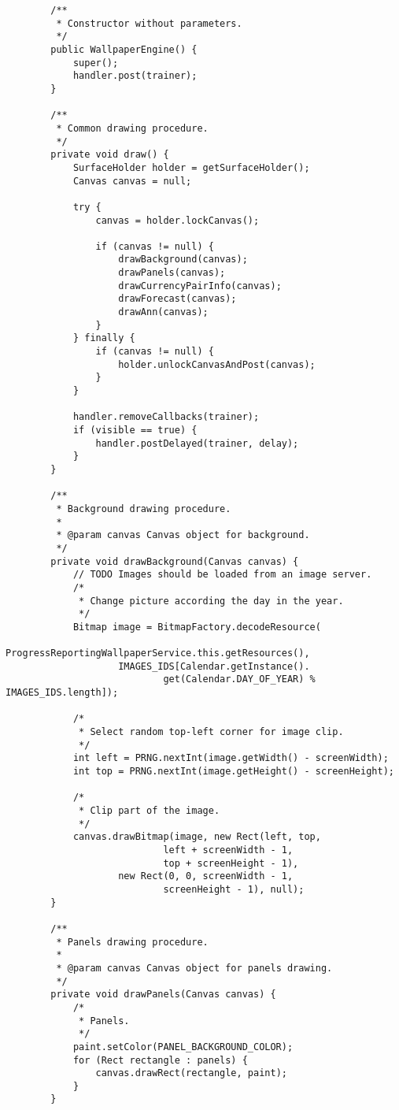 \begin{verbatim}
        /**
         * Constructor without parameters.
         */
        public WallpaperEngine() {
            super();
            handler.post(trainer);
        }

        /**
         * Common drawing procedure.
         */
        private void draw() {
            SurfaceHolder holder = getSurfaceHolder();
            Canvas canvas = null;

            try {
                canvas = holder.lockCanvas();

                if (canvas != null) {
                    drawBackground(canvas);
                    drawPanels(canvas);
                    drawCurrencyPairInfo(canvas);
                    drawForecast(canvas);
                    drawAnn(canvas);
                }
            } finally {
                if (canvas != null) {
                    holder.unlockCanvasAndPost(canvas);
                }
            }

            handler.removeCallbacks(trainer);
            if (visible == true) {
                handler.postDelayed(trainer, delay);
            }
        }

        /**
         * Background drawing procedure.
         *
         * @param canvas Canvas object for background.
         */
        private void drawBackground(Canvas canvas) {
            // TODO Images should be loaded from an image server.
            /*
             * Change picture according the day in the year.
             */
            Bitmap image = BitmapFactory.decodeResource(
                    ProgressReportingWallpaperService.this.getResources(),
                    IMAGES_IDS[Calendar.getInstance().
                            get(Calendar.DAY_OF_YEAR) % IMAGES_IDS.length]);

            /*
             * Select random top-left corner for image clip.
             */
            int left = PRNG.nextInt(image.getWidth() - screenWidth);
            int top = PRNG.nextInt(image.getHeight() - screenHeight);

            /*
             * Clip part of the image.
             */
            canvas.drawBitmap(image, new Rect(left, top,
                            left + screenWidth - 1,
                            top + screenHeight - 1),
                    new Rect(0, 0, screenWidth - 1,
                            screenHeight - 1), null);
        }

        /**
         * Panels drawing procedure.
         *
         * @param canvas Canvas object for panels drawing.
         */
        private void drawPanels(Canvas canvas) {
            /*
             * Panels.
             */
            paint.setColor(PANEL_BACKGROUND_COLOR);
            for (Rect rectangle : panels) {
                canvas.drawRect(rectangle, paint);
            }
        }


\end{verbatim}

